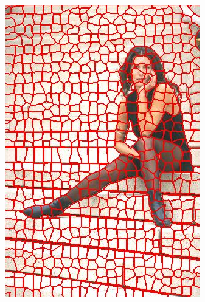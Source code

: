 \begin{figure}
{		\includegraphics[scale=\scalefivebsdtest]{pictures/bsd-test-7-tp}
	}
	\subfigure{
}
\end{figure}

